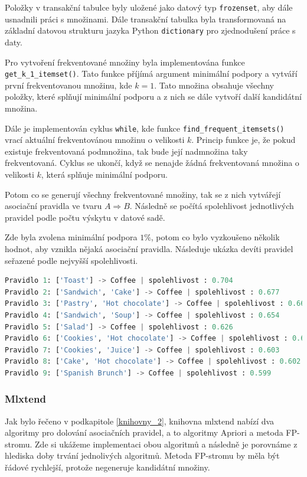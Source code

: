 Položky v transakční tabulce byly uložené jako datový typ \verb|frozenset|, aby dále usnadnili práci s množinami. Dále transakční tabulka byla transformovaná na základní datovou strukturu jazyka Python \verb|dictionary| pro zjednodušení práce s daty.

Pro vytvoření frekventované množiny byla implementována funkce \verb|get_k_1_itemset()|. Tato funkce příjímá argument minimální podpory a vytváří první frekventovanou množinu, kde $k=1$. Tato množina obsahuje všechny položky, které splňují minimální podporu a z nich se dále vytvoří další kandidátní množina. 

Dále je implementován cyklus \verb|while|, kde funkce \verb|find_frequent_itemsets()| vrací aktuální frekventovánou množinu o velikosti $k$. Princip funkce je, že pokud existuje frekventovaná podmnožina, tak bude její nadmnožina taky frekventovaná. Cyklus se ukončí, když se nenajde žádná frekventovaná množina o velikosti $k$, která splňuje minimální podporu.

Potom co se generují všechny frekventované množiny, tak se z nich vytvářejí asociační pravidla ve tvaru $A \Rightarrow B$. Následně se počítá spolehlivost jednotlivých pravidel podle počtu výskytu v datové sadě.

Zde byla zvolena minimální podpora $1\%$, potom co bylo vyzkoušeno několik hodnot, aby vznikla nějaká asociační pravidla. Následuje ukázka devíti pravidel seřazené podle nejvyšší spolehlivosti. 
\begin{mdframed}
\begin{lstlisting}[language=Python]
Pravidlo 1: ['Toast'] -> Coffee | spolehlivost : 0.704
Pravidlo 2: ['Sandwich', 'Cake'] -> Coffee | spolehlivost : 0.677
Pravidlo 3: ['Pastry', 'Hot chocolate'] -> Coffee | spolehlivost : 0.667
Pravidlo 4: ['Sandwich', 'Soup'] -> Coffee | spolehlivost : 0.654
Pravidlo 5: ['Salad'] -> Coffee | spolehlivost : 0.626
Pravidlo 6: ['Cookies', 'Hot chocolate'] -> Coffee | spolehlivost : 0.614
Pravidlo 7: ['Cookies', 'Juice'] -> Coffee | spolehlivost : 0.603
Pravidlo 8: ['Cake', 'Hot chocolate'] -> Coffee | spolehlivost : 0.602
Pravidlo 9: ['Spanish Brunch'] -> Coffee | spolehlivost : 0.599
\end{lstlisting}   
\end{mdframed}

\subsubsection*{Mlxtend}
Jak bylo řečeno v podkapitole \ref{knihovny_2}, knihovna mlxtend nabízí dva algoritmy pro dolování asociačních pravidel, a to algoritmy Apriori a metoda FP-stromu. Zde si ukážeme implementaci obou algoritmů a následně je porovnáme z hlediska doby trvání jednolivých algoritmů. Metoda FP-stromu by měla být řádové rychlejší, protože negeneruje kandidátní množiny. 


